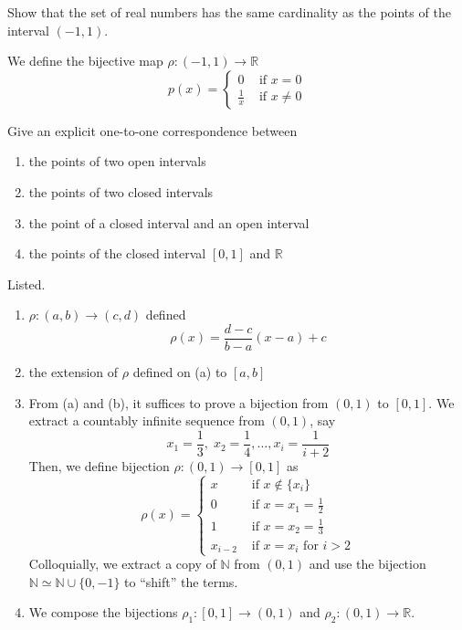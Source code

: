 \documentclass{article}
\begin{document}
    \begin{exercise}[Zorich 2.4.1]
    Show that the set of real numbers has the same cardinality as the points of the interval $(-1, 1)$. 
    \end{exercise}

    \begin{solution}
    We define the bijective map $\rho: (-1, 1) \longrightarrow \mathbb{R}$ 
    \[p(x) = \begin{cases} 
    0 & \text{ if } x = 0 \\
    \frac{1}{x} & \text{ if } x \neq 0 
    \end{cases}\]
    \end{solution}

    \begin{exercise}[Zorich 2.4.2]
    Give an explicit one-to-one correspondence between 
    \begin{enumerate}
        \item the points of two open intervals 
        \item the points of two closed intervals 
        \item the point of a closed interval and an open interval 
        \item the points of the closed interval $[0, 1]$ and $\mathbb{R}$
    \end{enumerate}
    \end{exercise}

    \begin{solution}
    Listed. 
    \begin{enumerate}
        \item $\rho: (a, b) \longrightarrow (c, d)$ defined 
        \[\rho(x) = \frac{d - c}{b - a} (x - a) + c \]
        \item the extension of $\rho$ defined on (a) to $[a, b]$
        \item From (a) and (b), it suffices to prove a bijection from $(0, 1)$ to $[0, 1]$. We extract a countably infinite sequence from $(0, 1)$, say 
        \[x_1 = \frac{1}{3}, \; x_2 = \frac{1}{4}, \ldots, x_i = \frac{1}{i+2}\]
        Then, we define bijection $\rho: (0, 1) \longrightarrow [0, 1]$ as 
        \[\rho (x) = \begin{cases}
        x & \text{ if } x \not\in \{x_i\} \\
        0 & \text{ if } x = x_1 = \frac{1}{2} \\
        1 & \text{ if } x = x_2 = \frac{1}{3} \\
        x_{i-2} & \text{ if } x = x_i \text{ for } i > 2
        \end{cases}\]
        Colloquially, we extract a copy of $\mathbb{N}$ from $(0, 1)$ and use the bijection $\mathbb{N} \simeq \mathbb{N} \cup \{0, -1\}$ to ``shift'' the terms. 
        \item We compose the bijections $\rho_1 : [0, 1] \longrightarrow (0, 1)$ and $\rho_2: (0, 1) \longrightarrow \mathbb{R}$. 
    \end{enumerate}
    \end{solution}
\end{document}
